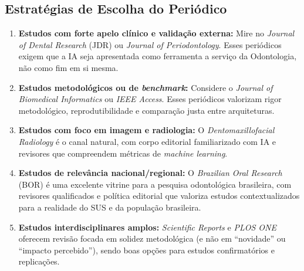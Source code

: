 \subsection{Estratégias de Escolha do Periódico}

\begin{enumerate}
  \item \textbf{Estudos com forte apelo clínico e validação externa:} Mire no
    \textit{Journal of Dental Research} (JDR) ou \textit{Journal of
    Periodontology}. Esses periódicos exigem que a IA seja apresentada como
    ferramenta a serviço da Odontologia, não como fim em si mesma.

  \item \textbf{Estudos metodológicos ou de \textit{benchmark}:} Considere o
    \textit{Journal of Biomedical Informatics} ou \textit{IEEE Access}. Esses
    periódicos valorizam rigor metodológico, reprodutibilidade e comparação
    justa entre arquiteturas.

  \item \textbf{Estudos com foco em imagem e radiologia:} O
    \textit{Dentomaxillofacial Radiology} é o canal natural, com corpo editorial
    familiarizado com IA e revisores que compreendem métricas de \textit{machine
    learning}.

  \item \textbf{Estudos de relevância nacional/regional:} O \textit{Brazilian
    Oral Research} (BOR) é uma excelente vitrine para a pesquisa odontológica
    brasileira, com revisores qualificados e política editorial que valoriza
    estudos contextualizados para a realidade do SUS e da população brasileira.

  \item \textbf{Estudos interdisciplinares amplos:} \textit{Scientific Reports}
    e \textit{PLOS ONE} oferecem revisão focada em solidez metodológica (e não em
    ``novidade'' ou ``impacto percebido''), sendo boas opções para estudos
    confirmatórios e replicações.
\end{enumerate}


